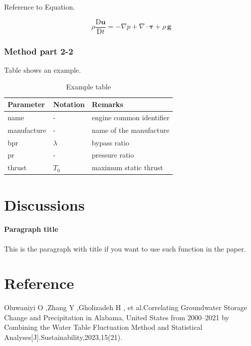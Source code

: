\documentclass[
  manuscript=article,  %
  layout=preprint,  %
  year=20xx,
  volume=x,
]{extra/joas}
\begin{document}
\blindtext Reference to Equation.

\begin{equation} \label{eq:cauchy_momentum}
\rho\frac{\mathrm{D} \mathbf{u}}{\mathrm{D} t} = - \nabla p + \nabla \cdot \boldsymbol \tau + \rho\,\mathbf{g}
\end{equation}


\subsubsection{Method part 2-2}

\blindtext Table shows an example.

\begin{table}[H]
  \centering
  \small
  \caption{Example table}
  \label{tb:example_table}
  \begin{tabular}{lll}
  \toprule
  \textbf{Parameter} & \textbf{Notation} & \textbf{Remarks} \\
  \midrule
  name & - & engine common identifier \\
  manufacture & - & name of the manufacture  \\
  bpr & $\lambda$ & bypass ratio \\
  pr & - & pressure ratio \\
  thrust & $T_0$ & maximum static thrust\\
  \bottomrule
  \end{tabular}
\end{table}

\blindtext


\section{Discussions}

\paragraph{Paragraph title} This is the paragraph with title if you want to use such function in the paper. \blindtext


\section{Reference}
\renewcommand{\section}[2]{} 
\begin{thebibliography}{20}

    Oluwaniyi O ,Zhang Y ,Gholizadeh H , et al.Correlating Groundwater Storage Change and Precipitation in Alabama, United States from 2000–2021 by Combining the Water Table Fluctuation Method and Statistical Analyses[J].Sustainability,2023,15(21).

  \end{thebibliography}
\end{document}
